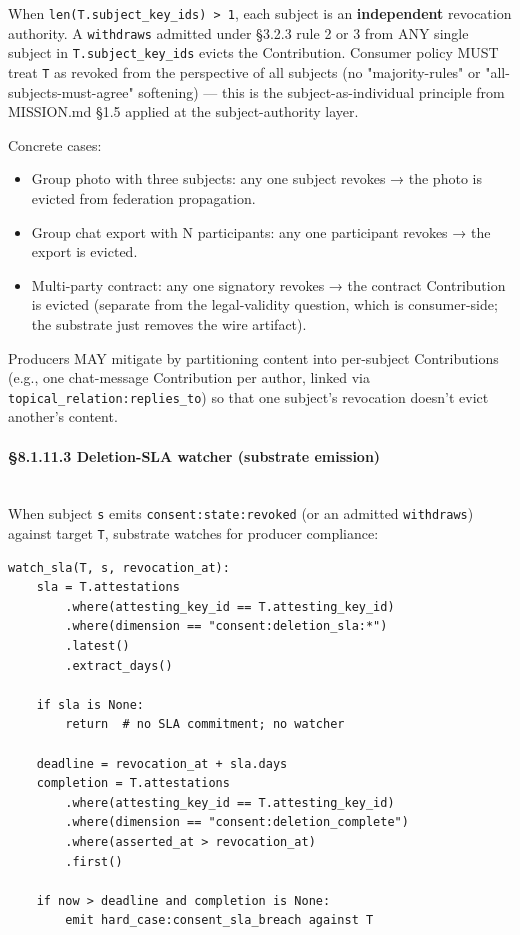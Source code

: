 \documentclass[11pt]{article}
\begin{document}
When \texttt{len(T.subject\_key\_ids) > 1}, each subject is an \textbf{independent} revocation authority. A \texttt{withdraws} admitted under §3.2.3 rule 2 or 3 from ANY single subject in \texttt{T.subject\_key\_ids} evicts the Contribution. Consumer policy MUST treat \texttt{T} as revoked from the perspective of all subjects (no "majority-rules" or "all-subjects-must-agree" softening) — this is the subject-as-individual principle from MISSION.md §1.5 applied at the subject-authority layer.


Concrete cases:

\begin{itemize}\setlength\itemsep{0pt}
\item Group photo with three subjects: any one subject revokes → the photo is evicted from federation propagation.
\item Group chat export with N participants: any one participant revokes → the export is evicted.
\item Multi-party contract: any one signatory revokes → the contract Contribution is evicted (separate from the legal-validity question, which is consumer-side; the substrate just removes the wire artifact).
\end{itemize}


Producers MAY mitigate by partitioning content into per-subject Contributions (e.g., one chat-message Contribution per author, linked via \texttt{topical\_relation:replies\_to}) so that one subject's revocation doesn't evict another's content.


\paragraph{§8.1.11.3 Deletion-SLA watcher (substrate emission)}\mbox{}\\


When subject \texttt{s} emits \texttt{consent:state:revoked} (or an admitted \texttt{withdraws}) against target \texttt{T}, substrate watches for producer compliance:


\begin{lstlisting}
watch_sla(T, s, revocation_at):
    sla = T.attestations
        .where(attesting_key_id == T.attesting_key_id)
        .where(dimension == "consent:deletion_sla:*")
        .latest()
        .extract_days()

    if sla is None:
        return  # no SLA commitment; no watcher

    deadline = revocation_at + sla.days
    completion = T.attestations
        .where(attesting_key_id == T.attesting_key_id)
        .where(dimension == "consent:deletion_complete")
        .where(asserted_at > revocation_at)
        .first()

    if now > deadline and completion is None:
        emit hard_case:consent_sla_breach against T
\end{lstlisting}
\end{document}
